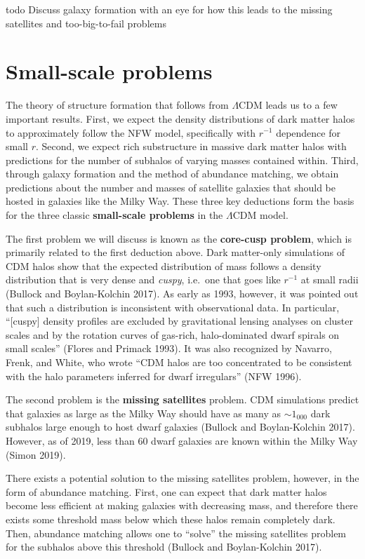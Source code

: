todo Discuss galaxy formation with an eye for how this leads to the
missing satellites and too-big-to-fail problems

\hypertarget{small-scale-problems}{%
\section{Small-scale problems}\label{small-scale-problems}}

The theory of structure formation that follows from \(\Lambda\)CDM leads
us to a few important results. First, we expect the density
distributions of dark matter halos to approximately follow the NFW
model, specifically with \(r^{-1}\) dependence for small \(r\). Second,
we expect rich substructure in massive dark matter halos with
predictions for the number of subhalos of varying masses contained
within. Third, through galaxy formation and the method of abundance
matching, we obtain predictions about the number and masses of satellite
galaxies that should be hosted in galaxies like the Milky Way. These
three key deductions form the basis for the three classic
\textbf{small-scale problems} in the \(\Lambda\)CDM model.

The first problem we will discuss is known as the \textbf{core-cusp
problem}, which is primarily related to the first deduction above. Dark
matter-only simulations of CDM halos show that the expected distribution
of mass follows a density distribution that is very dense and
\emph{cuspy}, i.e.~one that goes like \(r^{-1}\) at small radii (Bullock
and Boylan-Kolchin 2017). As early as 1993, however, it was pointed out
that such a distribution is inconsistent with observational data. In
particular, ``{[}cuspy{]} density profiles are excluded by gravitational
lensing analyses on cluster scales and by the rotation curves of
gas-rich, halo-dominated dwarf spirals on small scales'' (Flores and
Primack 1993). It was also recognized by Navarro, Frenk, and White, who
wrote ``CDM halos are too concentrated to be consistent with the halo
parameters inferred for dwarf irregulars'' (NFW 1996).

The second problem is the \textbf{missing satellites} problem. CDM
simulations predict that galaxies as large as the Milky Way should have
as many as \(\sim 1_000\) dark subhalos large enough to host dwarf
galaxies (Bullock and Boylan-Kolchin 2017). However, as of 2019, less
than 60 dwarf galaxies are known within the Milky Way (Simon 2019).

There exists a potential solution to the missing satellites problem,
however, in the form of abundance matching. First, one can expect that
dark matter halos become less efficient at making galaxies with
decreasing mass, and therefore there exists some threshold mass below
which these halos remain completely dark. Then, abundance matching
allows one to ``solve'' the missing satellites problem for the subhalos
above this threshold (Bullock and Boylan-Kolchin 2017).

